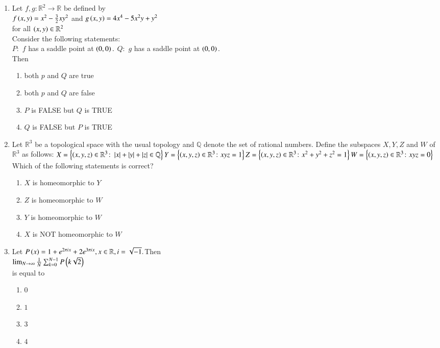 \documentclass[journal]{IEEEtran}
\begin{document}
\begin{enumerate}
    \item Let $f,g\colon\mathbb{R}^2\rightarrow\mathbb{R}$ be defined by\\
    $f\left(x,y\right)=x^2-\frac{3}{2}xy^2$ and $g\left(x,y\right)=4x^4-5x^2y+y^2$\\
    for all $\left(x,y\right)\in \mathbb{R}^2$\\
    Consider the following statements:\\
    $P\colon$ $f$ has a saddle point at $\left(0,0\right).$
    $Q\colon$ $g$ has a saddle point at $\left(0,0\right).$\\
    Then
    \begin{enumerate}
        \item both $p$ and $Q$ are true
        \item both $p$ and $Q$ are false
        \item $P$ is FALSE but $Q$ is TRUE
        \item $Q$ is FALSE but $P$ is TRUE
    \end{enumerate}
    \item Let $\mathbb{R}^3$ be a topological space with the usual topology and $\mathbb{Q}$ denote the set of rational numbers. Define the subspaces $X,Y,Z$ and $W$ of $\mathbb{R}^3$ as follows:
    $X=\left\{\left(x,y,z\right)\in \mathbb{R}^3\colon \left\vert x\right\vert+\left\vert y\right\vert+\left\vert z\right\vert\in\mathbb{Q}\right\}
    \\Y=\left\{\left(x,y,z\right)\in \mathbb{R}^3\colon xyz=1\right\}\\
    Z=\left\{\left(x,y,z\right)\in \mathbb{R}^3\colon x^2+y^2+z^2=1\right\}\\
    W=\left\{\left(x,y,z\right)\in \mathbb{R}^3\colon xyz=0\right\}$\\
    Which of the following statements is correct?
    \begin{enumerate}
        \item $X$ is homeomorphic to $Y$
        \item $Z$ is homeomorphic to $W$
        \item $Y$ is homeomorphic to $W$
        \item $X$ is NOT homeomorphic to $W$
    \end{enumerate}
    \item Let $P\left(x\right)=1+e^{2\pi ix}+2e^{3\pi ix},x\in \mathbb{R},i=\sqrt{-1}.$Then\\
    $\lim_{N\rightarrow\infty}\frac{1}{N}\sum_{k=0}^{N-1}P\left(k\sqrt{2}\right)$\\
    is equal to
    \begin{enumerate}
        \item $0$
        \item $1$
        \item $3$
        \item $4$
    \end{enumerate}
\end{enumerate}
\end{document}
